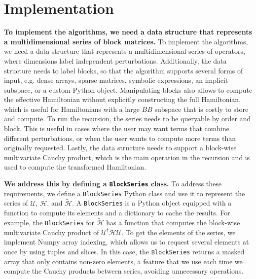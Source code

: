 \section{Implementation}

\textbf{To implement the algorithms, we need a data structure that represents a
multidimensional series of block matrices.}
To implement the algorithms, we need a data structure that represents a
multidimensional series of operators, where dimensions label independent
perturbations.
Additionally, the data structure needs to label blocks, so that the algorithm
supports several forms of input, e.g. dense arrays, sparse matrices, symbolic
expressions, an implicit subspace, or a custom Python object.
Manipulating blocks also allows to compute the effective Hamiltonian without
explicitly constructing the full Hamiltonian, which is useful for Hamiltonians
with a large $BB$ subspace that is costly to store and compute.
To run the recursion, the series needs to be queryable by order and block.
This is useful in cases where the user may want terms that combine different
perturbations, or when the user wants to compute more terms than originally
requested.
Lastly, the data structure needs to support a block-wise multivariate Cauchy
product, which is the main operation in the recursion and is used to compute
the transformed Hamiltonian.

\textbf{We address this by defining a \texttt{BlockSeries} class.}
To address these requirements, we define a \texttt{BlockSeries} Python class and use
it to represent the series of $\mathcal{U}$, $\mathcal{H}$, and
$\tilde{\mathcal{H}}$.
A \texttt{BlockSeries} is a Python object equipped with a function to compute its
elements and a dictionary to cache the results.
For example, the \texttt{BlockSeries} for $\tilde{\mathcal{H}}$ has a function that
computes the block-wise multivariate Cauchy product of $\mathcal{U}^{\dagger}
\mathcal{H} \mathcal{U}$.
To get the elements of the series, we implement Numpy array indexing,
which allows us to request several elements at once by using tuples and slices.
In this case, the \texttt{BlockSeries} returns a masked array that only contains
non-zero elements, a feature that we use each time we compute the Cauchy
products between series, avoiding unnecessary operations.

